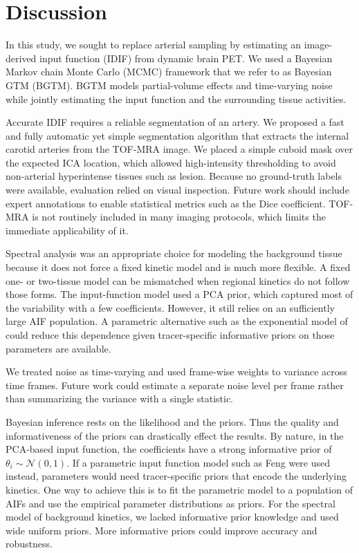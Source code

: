 \chapter{Discussion}

In this study, we sought to replace arterial sampling by estimating an image-derived input function (IDIF) from dynamic brain PET.
We used a Bayesian Markov chain Monte Carlo (MCMC) framework that we refer to as Bayesian GTM (BGTM).
BGTM models partial-volume effects and time-varying noise while jointly estimating the input function and the surrounding tissue activities.

Accurate IDIF requires a reliable segmentation of an artery.
We proposed a fast and fully automatic yet simple segmentation algorithm that extracts the internal carotid arteries from the TOF-MRA image.
We placed a simple cuboid mask over the expected ICA location, which allowed high-intensity thresholding to avoid non-arterial hyperintense tissues such as lesion.
Because no ground-truth labels were available, evaluation relied on visual inspection. Future work should include expert annotations to enable statistical metrics such as the Dice coefficient.
TOF-MRA is not routinely included in many imaging protocols, which limits the immediate applicability of it.

Spectral analysis was an appropriate choice for modeling the background tissue because it does not force a fixed kinetic model and is much more flexible.
A fixed one- or two-tissue model can be mismatched when regional kinetics do not follow those forms.
The input-function model used a PCA prior, which captured most of the variability with a few coefficients.
However, it still relies on an sufficiently large AIF population.
A parametric alternative such as the exponential model of \citeauthor{feng1993models} \cite{feng1993models} could reduce this dependence given tracer-specific informative priors on those parameters are available.

We treated noise as time-varying and used frame-wise weights to variance across time frames.
Future work could estimate a separate noise level per frame rather than summarizing the variance with a single statistic.

Bayesian inference rests on the likelihood and the priors. Thus the quality and informativeness of the priors can drastically effect the results.
By nature, in the PCA-based input function, the coefficients have a strong informative prior of \(\theta_i \sim \mathcal{N}(0,1)\).
If a parametric input function model such as Feng were used instead, parameters would need tracer-specific priors that encode the underlying kinetics.
One way to achieve this is to fit the parametric model to a population of AIFs and use the empirical parameter distributions as priors.
For the spectral model of background kinetics, we lacked informative prior knowledge and used wide uniform priors.
More informative priors could improve accuracy and robustness.


